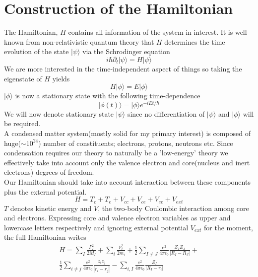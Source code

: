 \documentclass{article}
\begin{document}
\section*{Construction of the Hamiltonian}
The Hamiltonian, $H$ contains all information of the system in interest. It is well known from non-relativistic quantum theory that $H$ determines the time evolution of the state $|\psi\rangle$ via the Schrodinger equation
\begin{equation}
	i\hbar\partial_{t}|\psi\rangle=H|\psi\rangle
\end{equation}
We are more interested in the time-independent aspect of things so taking the eigenstate of $H$ yields
\begin{equation}
	H|\phi\rangle=E|\phi\rangle
\end{equation}
$|\phi\rangle$ is now a stationary state with the following time-dependence
\begin{equation}
	|\phi (t)\rangle=|\phi\rangle e^{-iEt/\hbar}
\end{equation}
We will now denote stationary state $|\psi\rangle$ since no differentiation of $|\psi\rangle$ and $|\phi\rangle$ will be required.\\
A condensed matter system(mostly solid for my primary interest) is composed of huge($\sim10^{24}$) number of constituents; electrons, protons, neutrons etc. Since condensation requires our theory to naturally be a 'low-energy' theory we effectively take into account only the valence electron and core(nucleus and inert electrons) degrees of freedom. \\
Our Hamiltonian should take into account interaction between these components plus the external potential.
\begin{equation}
	H=T_{c}+T_{e}+V_{cc}+V_{ce}+V_{ee}+V_{ext}
\end{equation}
$T$ denotes kinetic energy and $V$, the two-body Coulombic interaction among core and electrons. Expressing core and valence electron variables as upper and lowercase letters respectively and ignoring external potential $V_{ext}$ for the moment, the full Hamiltonian writes
\begin{multline}
	H=\sum_{I}\frac{P_{I}^{2}}{2M_{I}}+\sum_{i}\frac{p_{i}^{2}}{2m_{i}}+\frac{1}{2}\sum_{I\neq J}\frac{e^{2}}{4\pi\epsilon_{0}}\frac{Z_{I}Z_{J}}{|R_{I}-R_{J}|}+\\
	\frac{1}{2}\sum_{i\neq j}\frac{e^{2}}{4\pi\epsilon_{0}}\frac{z_{i}z_{j}}{|r_{i}-r_{j}|}-\sum_{i,I}\frac{e^{2}}{4\pi\epsilon_{0}}\frac{Z_{I}}{|R_{I}-r_{i}|}
\end{multline}
\end{document}

